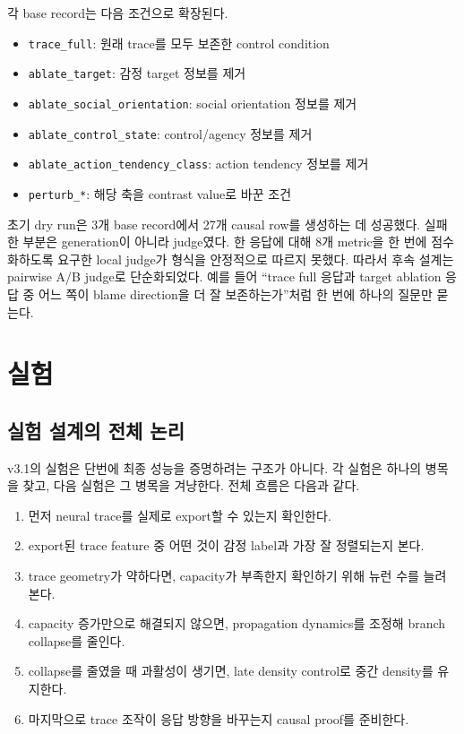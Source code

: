 \documentclass[11pt,a4paper]{article}
\begin{document}
각 base record는 다음 조건으로 확장된다.

\begin{itemize}
  \item \texttt{trace\_full}: 원래 trace를 모두 보존한 control condition
  \item \texttt{ablate\_target}: 감정 target 정보를 제거
  \item \texttt{ablate\_social\_orientation}: social orientation 정보를 제거
  \item \texttt{ablate\_control\_state}: control/agency 정보를 제거
  \item \texttt{ablate\_action\_tendency\_class}: action tendency 정보를 제거
  \item \texttt{perturb\_*}: 해당 축을 contrast value로 바꾼 조건
\end{itemize}

초기 dry run은 3개 base record에서 27개 causal row를 생성하는 데 성공했다. 실패한 부분은 generation이 아니라 judge였다. 한 응답에 대해 8개 metric을 한 번에 점수화하도록 요구한 local judge가 형식을 안정적으로 따르지 못했다. 따라서 후속 설계는 pairwise A/B judge로 단순화되었다. 예를 들어 ``trace full 응답과 target ablation 응답 중 어느 쪽이 blame direction을 더 잘 보존하는가''처럼 한 번에 하나의 질문만 묻는다.

\section{실험}

\subsection{실험 설계의 전체 논리}

v3.1의 실험은 단번에 최종 성능을 증명하려는 구조가 아니다. 각 실험은 하나의 병목을 찾고, 다음 실험은 그 병목을 겨냥한다. 전체 흐름은 다음과 같다.

\begin{enumerate}
  \item 먼저 neural trace를 실제로 export할 수 있는지 확인한다.
  \item export된 trace feature 중 어떤 것이 감정 label과 가장 잘 정렬되는지 본다.
  \item trace geometry가 약하다면, capacity가 부족한지 확인하기 위해 뉴런 수를 늘려 본다.
  \item capacity 증가만으로 해결되지 않으면, propagation dynamics를 조정해 branch collapse를 줄인다.
  \item collapse를 줄였을 때 과활성이 생기면, late density control로 중간 density를 유지한다.
  \item 마지막으로 trace 조작이 응답 방향을 바꾸는지 causal proof를 준비한다.
\end{enumerate}
\end{document}

